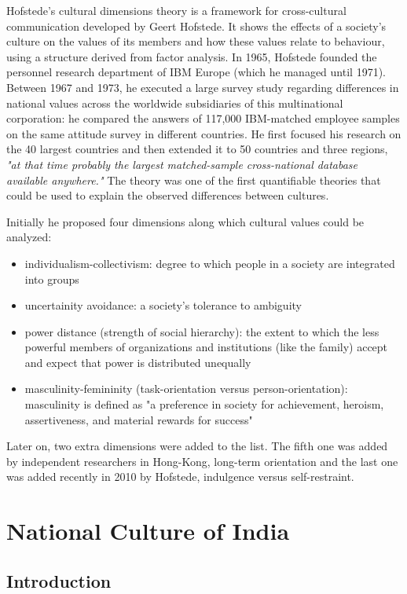 \documentclass{article}
\begin{document}
Hofstede's cultural dimensions theory is a framework for cross-cultural communication developed by Geert Hofstede. It shows the effects of a society's culture on the values of its members and how these values relate to behaviour, using a structure derived from factor analysis. In 1965, Hofstede founded the personnel research department of IBM Europe (which he managed until 1971). Between 1967 and 1973, he executed a large survey study regarding differences in national values across the worldwide subsidiaries of this multinational corporation: he compared the answers of 117,000 IBM-matched employee samples on the same attitude survey in different countries. He first focused his research on the 40 largest countries and then extended it to 50 countries and three regions, \textit{"at that time probably the largest matched-sample cross-national database available anywhere."} The theory was one of the first quantifiable theories that could be used to explain the observed differences between cultures.

Initially he proposed four dimensions along which cultural values could be analyzed: 
\begin{itemize}
    \item individualism-collectivism: degree to which people in a society are integrated into groups
    \item uncertainity avoidance: a society's tolerance to ambiguity
    \item power distance (strength of social hierarchy): the extent to which the less powerful members of organizations and institutions (like the family) accept and expect that power is distributed unequally
    \item masculinity-femininity (task-orientation versus person-orientation): masculinity is defined as "a preference in society for achievement, heroism, assertiveness, and material rewards for success"
\end{itemize}
Later on, two extra dimensions were added to the list. The fifth one was added by independent researchers in Hong-Kong, long-term orientation and the last one was added recently in 2010 by Hofstede, indulgence versus self-restraint.

\section{National Culture of India}

\subsection{Introduction}
\end{document}
